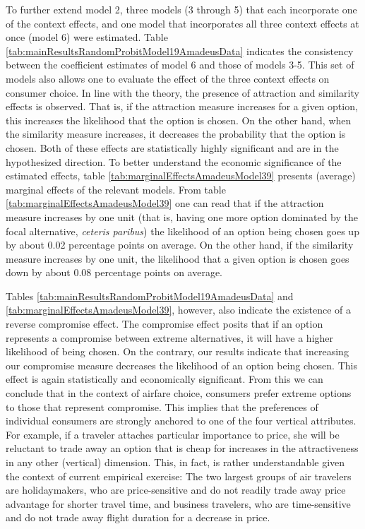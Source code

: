 \documentclass[a4paper,12pt]{article}
\begin{document}
To further extend model 2, three models (3 through 5) that each incorporate one of the context effects, and one model that incorporates all three context effects at once (model 6) were estimated. Table \ref{tab:mainResultsRandomProbitModel19AmadeusData} indicates the consistency between the coefficient estimates of model 6 and those of models 3-5. This set of models also allows one to evaluate the effect of the three context effects on consumer choice. In line with the theory, the presence of attraction and similarity effects is observed. That is, if the attraction measure increases for a given option, this increases the likelihood that the option is chosen. On the other hand, when the similarity measure increases, it decreases the probability that the option is chosen. Both of these effects are statistically highly significant and are in the hypothesized direction. To better understand the economic significance of the estimated effects, table \ref{tab:marginalEffectsAmadeusModel39} presents (average) marginal effects of the relevant models. From table \ref{tab:marginalEffectsAmadeusModel39} one can read that if the attraction measure increases by one unit (that is, having one more option dominated by the focal alternative, \textit{ceteris paribus}) the likelihood of an option being chosen goes up by about 0.02 percentage points on average. On the other hand, if the similarity measure increases by one unit, the likelihood that a given option is chosen goes down by about 0.08 percentage points on average.

Tables \ref{tab:mainResultsRandomProbitModel19AmadeusData} and \ref{tab:marginalEffectsAmadeusModel39}, however, also indicate the existence of a reverse compromise effect. The compromise effect posits that if an option represents a compromise between extreme alternatives, it will have a higher likelihood of being chosen. On the contrary, our results indicate that increasing our compromise measure decreases the likelihood of an option being chosen. This effect is again statistically and economically significant. From this we can conclude that in the context of airfare choice, consumers prefer extreme options to those that represent compromise. This implies that the preferences of individual consumers are strongly anchored to one of the four vertical attributes. For example, if a traveler attaches particular importance to price, she will be reluctant to trade away an option that is cheap for increases in the attractiveness in any other (vertical) dimension. This, in fact, is rather understandable given the context of current empirical exercise: The two largest groups of air travelers are holidaymakers, who are price-sensitive and do not readily trade away price advantage for shorter travel time, and business travelers, who are time-sensitive and do not trade away flight duration for a decrease in price.
\end{document}
